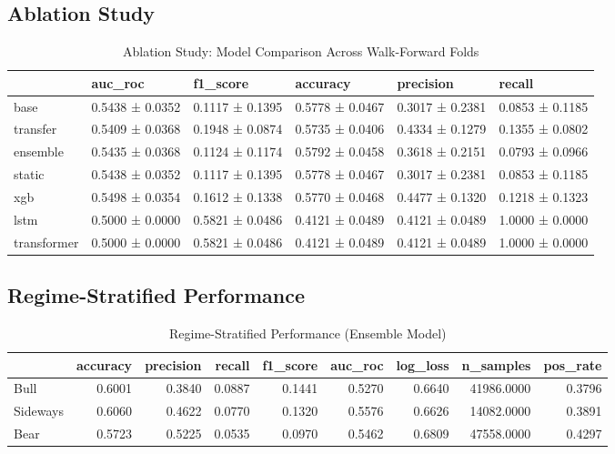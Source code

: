 \documentclass[12pt,a4paper]{article}
\begin{document}
\subsection{Ablation Study}

\begin{table}
\caption{Ablation Study: Model Comparison Across Walk-Forward Folds}
\label{tab:ablation}
\begin{tabular}{llllll}
\toprule
 & auc_roc & f1_score & accuracy & precision & recall \\
\midrule
base & 0.5438 ± 0.0352 & 0.1117 ± 0.1395 & 0.5778 ± 0.0467 & 0.3017 ± 0.2381 & 0.0853 ± 0.1185 \\
transfer & 0.5409 ± 0.0368 & 0.1948 ± 0.0874 & 0.5735 ± 0.0406 & 0.4334 ± 0.1279 & 0.1355 ± 0.0802 \\
ensemble & 0.5435 ± 0.0368 & 0.1124 ± 0.1174 & 0.5792 ± 0.0458 & 0.3618 ± 0.2151 & 0.0793 ± 0.0966 \\
static & 0.5438 ± 0.0352 & 0.1117 ± 0.1395 & 0.5778 ± 0.0467 & 0.3017 ± 0.2381 & 0.0853 ± 0.1185 \\
xgb & 0.5498 ± 0.0354 & 0.1612 ± 0.1338 & 0.5770 ± 0.0468 & 0.4477 ± 0.1320 & 0.1218 ± 0.1323 \\
lstm & 0.5000 ± 0.0000 & 0.5821 ± 0.0486 & 0.4121 ± 0.0489 & 0.4121 ± 0.0489 & 1.0000 ± 0.0000 \\
transformer & 0.5000 ± 0.0000 & 0.5821 ± 0.0486 & 0.4121 ± 0.0489 & 0.4121 ± 0.0489 & 1.0000 ± 0.0000 \\
\bottomrule
\end{tabular}
\end{table}


\subsection{Regime-Stratified Performance}

\begin{table}
\caption{Regime-Stratified Performance (Ensemble Model)}
\label{tab:regime}
\begin{tabular}{lrrrrrrrr}
\toprule
 & accuracy & precision & recall & f1_score & auc_roc & log_loss & n_samples & pos_rate \\
\midrule
Bull & 0.6001 & 0.3840 & 0.0887 & 0.1441 & 0.5270 & 0.6640 & 41986.0000 & 0.3796 \\
Sideways & 0.6060 & 0.4622 & 0.0770 & 0.1320 & 0.5576 & 0.6626 & 14082.0000 & 0.3891 \\
Bear & 0.5723 & 0.5225 & 0.0535 & 0.0970 & 0.5462 & 0.6809 & 47558.0000 & 0.4297 \\
\bottomrule
\end{tabular}
\end{table}
\end{document}
